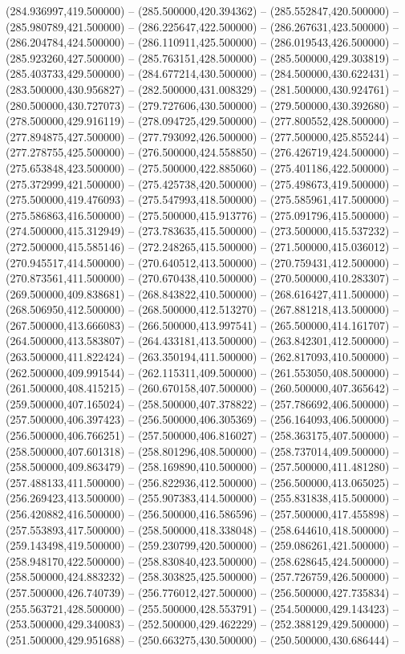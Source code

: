 (284.936997,419.500000) -- (285.500000,420.394362) -- (285.552847,420.500000) -- (285.980789,421.500000) -- (286.225647,422.500000) -- (286.267631,423.500000) -- (286.204784,424.500000) -- (286.110911,425.500000) -- (286.019543,426.500000) -- (285.923260,427.500000) -- (285.763151,428.500000) -- (285.500000,429.303819) -- (285.403733,429.500000) -- (284.677214,430.500000) -- (284.500000,430.622431) -- (283.500000,430.956827) -- (282.500000,431.008329) -- (281.500000,430.924761) -- (280.500000,430.727073) -- (279.727606,430.500000) -- (279.500000,430.392680) -- (278.500000,429.916119) -- (278.094725,429.500000) -- (277.800552,428.500000) -- (277.894875,427.500000) -- (277.793092,426.500000) -- (277.500000,425.855244) -- (277.278755,425.500000) -- (276.500000,424.558850) -- (276.426719,424.500000) -- (275.653848,423.500000) -- (275.500000,422.885060) -- (275.401186,422.500000) -- (275.372999,421.500000) -- (275.425738,420.500000) -- (275.498673,419.500000) -- (275.500000,419.476093) -- (275.547993,418.500000) -- (275.585961,417.500000) -- (275.586863,416.500000) -- (275.500000,415.913776) -- (275.091796,415.500000) -- (274.500000,415.312949) -- (273.783635,415.500000) -- (273.500000,415.537232) -- (272.500000,415.585146) -- (272.248265,415.500000) -- (271.500000,415.036012) -- (270.945517,414.500000) -- (270.640512,413.500000) -- (270.759431,412.500000) -- (270.873561,411.500000) -- (270.670438,410.500000) -- (270.500000,410.283307) -- (269.500000,409.838681) -- (268.843822,410.500000) -- (268.616427,411.500000) -- (268.506950,412.500000) -- (268.500000,412.513270) -- (267.881218,413.500000) -- (267.500000,413.666083) -- (266.500000,413.997541) -- (265.500000,414.161707) -- (264.500000,413.583807) -- (264.433181,413.500000) -- (263.842301,412.500000) -- (263.500000,411.822424) -- (263.350194,411.500000) -- (262.817093,410.500000) -- (262.500000,409.991544) -- (262.115311,409.500000) -- (261.553050,408.500000) -- (261.500000,408.415215) -- (260.670158,407.500000) -- (260.500000,407.365642) -- (259.500000,407.165024) -- (258.500000,407.378822) -- (257.786692,406.500000) -- (257.500000,406.397423) -- (256.500000,406.305369) -- (256.164093,406.500000) -- (256.500000,406.766251) -- (257.500000,406.816027) -- (258.363175,407.500000) -- (258.500000,407.601318) -- (258.801296,408.500000) -- (258.737014,409.500000) -- (258.500000,409.863479) -- (258.169890,410.500000) -- (257.500000,411.481280) -- (257.488133,411.500000) -- (256.822936,412.500000) -- (256.500000,413.065025) -- (256.269423,413.500000) -- (255.907383,414.500000) -- (255.831838,415.500000) -- (256.420882,416.500000) -- (256.500000,416.586596) -- (257.500000,417.455898) -- (257.553893,417.500000) -- (258.500000,418.338048) -- (258.644610,418.500000) -- (259.143498,419.500000) -- (259.230799,420.500000) -- (259.086261,421.500000) -- (258.948170,422.500000) -- (258.830840,423.500000) -- (258.628645,424.500000) -- (258.500000,424.883232) -- (258.303825,425.500000) -- (257.726759,426.500000) -- (257.500000,426.740739) -- (256.776012,427.500000) -- (256.500000,427.735834) -- (255.563721,428.500000) -- (255.500000,428.553791) -- (254.500000,429.143423) -- (253.500000,429.340083) -- (252.500000,429.462229) -- (252.388129,429.500000) -- (251.500000,429.951688) -- (250.663275,430.500000) -- (250.500000,430.686444) -- 